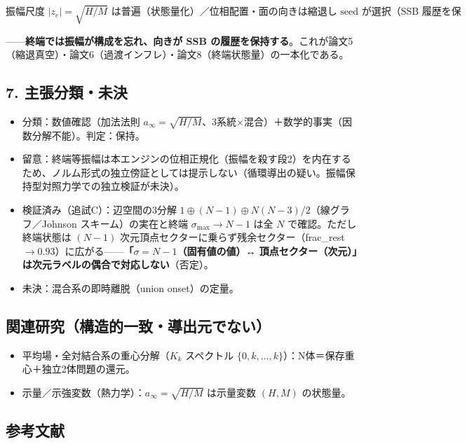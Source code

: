 \documentclass[
  a4paper,
]{ltjsarticle}
\providecommand{\tightlist}{%
  \setlength{\itemsep}{0pt}\setlength{\parskip}{0pt}}
\begin{document}
\[\boxed{\text{振幅尺度 }|z_e|=\sqrt{H/M}\text{ は普遍（状態量化）／位相配置・面の向きは縮退し seed が選択（SSB 履歴を保持）}}\]

------\textbf{終端では振幅が構成を忘れ、向きが SSB
の履歴を保持する}。これが論文5（縮退真空）・論文6（過渡インフレ）・論文8（終端状態量）の一本化である。

\subsection{7.
主張分類・未決}\label{ux4e3bux5f35ux5206ux985eux672aux6c7a}

\begin{itemize}
\tightlist
\item
  分類：数値確認（加法法則
  \(a_\infty=\sqrt{H/M}\)、3系統×混合）＋数学的事実（因数分解不能）。判定：保持。
\item
  留意：終端等振幅は本エンジンの位相正規化（振幅を殺す段2）を内在するため、ノルム形式の独立傍証としては提示しない（循環導出の疑い。振幅保持型対照力学での独立検証が未決）。
\item
  検証済み（追試C）：辺空間の3分解
  \(1\oplus(N-1)\oplus N(N-3)/2\)（線グラフ／Johnson
  スキーム）の実在と終端 \(\sigma_{\max}\to N-1\) は全 \(N\)
  で確認。ただし終端状態は \((N-1)\)
  次元頂点セクターに乗らず残余セクター（frac\_rest
  \(\to0.93\)）に広がる------\textbf{「\(\sigma=N-1\)（固有値の値）↔
  頂点セクター（次元）」は次元ラベルの偶合で対応しない}（否定）。
\item
  未決：混合系の即時離脱（union onset）の定量。
\end{itemize}

\subsection{関連研究（構造的一致・導出元でない）}\label{ux95a2ux9023ux7814ux7a76ux69cbux9020ux7684ux4e00ux81f4ux5c0eux51faux5143ux3067ux306aux3044}

\begin{itemize}
\tightlist
\item
  平均場・全対結合系の重心分解（\(K_k\) スペクトル
  \(\{0,k,\ldots,k\}\)）：N体＝保存重心＋独立2体問題の還元。
\item
  示量／示強変数（熱力学）：\(a_\infty=\sqrt{H/M}\) は示量変数 \((H,M)\)
  の状態量。
\end{itemize}

\subsection{参考文献}\label{ux53c2ux8003ux6587ux732e}
\end{document}
